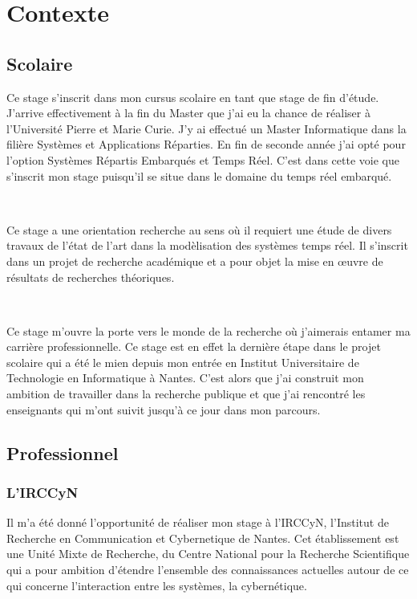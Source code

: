 \chapter{Contexte}
  \section{Scolaire}
    
    Ce stage s'inscrit dans mon cursus scolaire en tant que stage de fin
    d'étude. J'arrive effectivement à la fin du Master que j'ai eu la chance de
    réaliser à l'Université Pierre et Marie Curie. J'y ai effectué un Master
    Informatique dans la filière Systèmes et Applications Réparties. En fin de
    seconde année j'ai opté pour l'option Systèmes Répartis Embarqués et Temps
    Réel. C'est dans cette voie que s'inscrit mon stage puisqu'il se situe dans
    le domaine du temps réel embarqué.

    ~
    
    Ce stage a une orientation recherche au sens où il requiert une étude de
    divers travaux de l'état de l'art dans la modèlisation des systèmes temps
    réel. Il s'inscrit dans un projet de recherche académique et a pour objet
    la mise en \oe uvre de résultats de recherches théoriques.

    ~
    
    Ce stage m'ouvre la porte vers le monde de la recherche où j'aimerais
    entamer ma carrière professionnelle. Ce stage est en effet la dernière étape
    dans le projet scolaire qui a été le mien depuis mon entrée en Institut
    Universitaire de Technologie en Informatique à Nantes. C'est alors que j'ai
    construit mon ambition de travailler dans la recherche publique et que j'ai
    rencontré les enseignants qui m'ont suivit jusqu'à ce jour dans mon
    parcours.
    
  \section{Professionnel}
    \subsection{L'IRCCyN}

      Il m'a été donné l'opportunité de réaliser mon stage à l'IRCCyN,
      l'Institut de Recherche en Communication et Cybernetique de Nantes. Cet
      établissement est une Unité Mixte de Recherche, du Centre National pour la
      Recherche Scientifique qui a pour ambition d'étendre l'ensemble des
      connaissances actuelles autour de ce qui concerne l'interaction entre les
      systèmes, la cybernétique.

